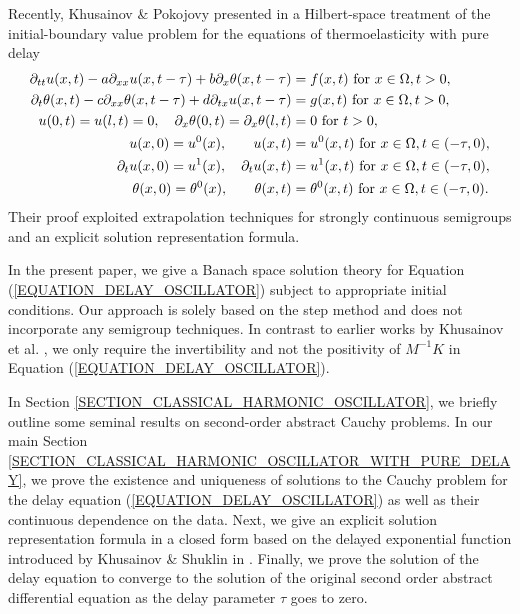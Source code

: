 \documentclass[12pt]{article}
\numberwithin{equation}{section}
\numberwithin{equation}{section}
\begin{document}
Recently, Khusainov \& Pokojovy presented in \cite{KhuPo2014} a Hilbert-space treatment of the initial-boundary value problem
for the equations of thermoelasticity with pure delay
\begin{equation}
	\begin{split}
		\partial_{tt} u(x, t) - a \partial_{xx} u(x, t - \tau) + b \partial_{x} \theta(x, t - \tau)  &= f(x, t) \text{ for } x \in \Omega, t > 0, \\
		\partial_{t} \theta(x, t) - c \partial_{xx} \theta(x, t - \tau) + d \partial_{tx} u(x, t - \tau) &= g(x, t) \text{ for } x \in \Omega, t > 0, \\
		u(0, t) = u(l, t) = 0, \quad \partial_{x} \theta(0, t) = \partial_{x} \theta(l, t) &= 0 \text{ for } t > 0, \\
		\phantom{\partial_{t}} u(x, 0) = u^{0}(x), \quad \phantom{\partial_{t}} u(x, t) &= u^{0}(x, t) \text{ for } x \in \Omega, t \in (-\tau, 0), \\
		\partial_{t} u(x, 0) = u^{1}(x), \quad \partial_{t} u(x, t) &= u^{1}(x, t) \text{ for } x \in \Omega, t \in (-\tau, 0), \\
		\phantom{\partial_{t}} \theta(x, 0) = \theta^{0}(x), \quad \phantom{\partial_{t}} \theta(x, t) &= \theta^{0}(x, t) \text{ for } x \in \Omega, t \in (-\tau, 0).
	\end{split}
	\notag
\end{equation}
Their proof exploited extrapolation techniques for strongly continuous semigroups
and an explicit solution representation formula.

In the present paper, we give a Banach space solution theory for Equation (\ref{EQUATION_DELAY_OSCILLATOR})
subject to appropriate initial conditions.
Our approach is solely based on the step method and does not incorporate any semigroup techniques.
In contrast to earlier works by Khusainov et al. \cite{KhuDiRuLu2008, KhuIvaKo2006, KhuPoAzi2013},
we only require the invertibility and not the positivity of $M^{-1} K$ in Equation (\ref{EQUATION_DELAY_OSCILLATOR}).

In Section \ref{SECTION_CLASSICAL_HARMONIC_OSCILLATOR},
we briefly outline some seminal results on second-order abstract Cauchy problems.
In our main Section \ref{SECTION_CLASSICAL_HARMONIC_OSCILLATOR_WITH_PURE_DELAY},
we prove the existence and uniqueness of solutions to the Cauchy problem for the delay equation (\ref{EQUATION_DELAY_OSCILLATOR})
as well as their continuous dependence on the data.
Next, we give an explicit solution representation formula in a closed form
based on the delayed exponential function introduced by Khusainov \& Shuklin in \cite{KhuShu2005}.
Finally, we prove the solution of the delay equation
to converge to the solution of the original second order abstract differential equation
as the delay parameter $\tau$ goes to zero.
\end{document}
